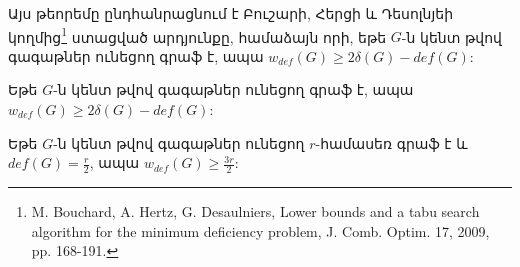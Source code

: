 Այս թեորեմը ընդհանրացնում է Բուշարի, Հերցի և Դեսոլնյեի կողմից\footnote{M. Bouchard, A. Hertz, G. Desaulniers, Lower bounds and a tabu search algorithm for the minimum deficiency problem, J. Comb. Optim. 17, 2009, pp. 168-191.} ստացված արդյունքը, համաձայն որի, եթե $G$-ն կենտ թվով գագաթներ ունեցող գրաֆ է, ապա $w_{def}(G)\geq 2\delta(G)-def(G)$:

\begin{hide}
\begin{corollary}
\label{c3_wdef_odd}\cite{BouchardHertzDesaulniers} Եթե $G$-ն կենտ թվով գագաթներ ունեցող գրաֆ է, ապա $w_{def}(G)\geq 2\delta(G)-def(G)$:
\end{corollary}

\begin{corollary}
\label{c3_wdef_odd_regular}\cite{BouchardHertzDesaulniers} Եթե $G$-ն կենտ թվով գագաթներ ունեցող $r$-համասեռ գրաֆ է և $def(G)=\frac{r}{2}$, ապա
$w_{def}(G)\geq \frac{3r}{2}$:
\end{corollary}
\end{hide}


